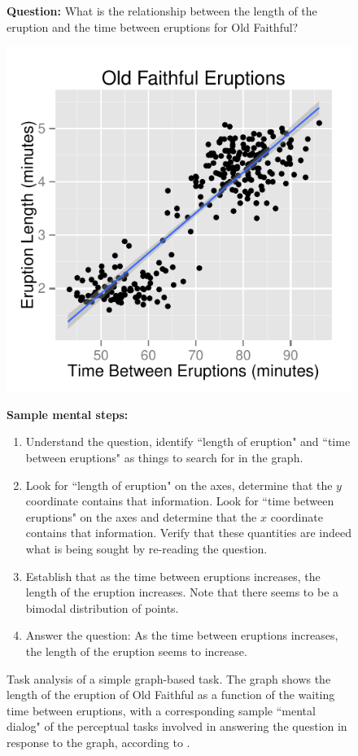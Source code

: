 \documentclass[11pt]{isuthesis}\usepackage[]{graphicx}\usepackage[]{color}
\begin{document}
\begin{figure}[htbp]
\textbf{Question:} What is the relationship between the length of the eruption and the time between eruptions for Old Faithful?
\begin{center}
\begin{minipage}[c]{.45\textwidth}
\includegraphics[width=\linewidth]{fig-steps}
\end{minipage}
\begin{minipage}[c]{.54\textwidth}
\textbf{Sample mental steps: }
{\small
\begin{enumerate}
\item Understand the question, identify ``length of eruption" and ``time between eruptions" as things to search for in the graph.
\item Look for ``length of eruption" on the axes, determine that the $y$ coordinate contains that information. Look for ``time between eruptions" on the axes and determine that the $x$ coordinate contains that information. Verify that these quantities are indeed what is being sought by re-reading the question. 
\item Establish that as the time between eruptions increases, the length of the eruption increases. Note that there seems to be a bimodal distribution of points. 
\item Answer the question: As the time between eruptions increases, the length of the eruption seems to increase.
\end{enumerate}
}
\end{minipage}
\end{center}
\caption[Task analysis of a simple graph]{Task analysis of a simple graph-based task. The graph shows the length of the eruption of Old Faithful as a function of the waiting time between eruptions, with a corresponding sample ``mental dialog" of the perceptual tasks involved in answering the question in response to the graph, according to \protect\citet{shah2005cambridge}. }\label{fig:taskgraph}
\end{figure}
\end{document}
